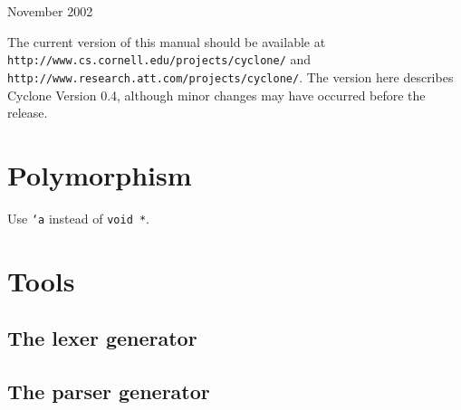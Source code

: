 \bigskip

\begin{center}
{\Large November 2002}
\end{center}

\bigskip

The current version of this manual should be available at\\
\texttt{http://www.cs.cornell.edu/projects/cyclone/} and\\
\texttt{http://www.research.att.com/projects/cyclone/}.  The version
here describes Cyclone Version 0.4, although minor changes may have
occurred before the release.

\newpage

\tableofcontents
\newpage





\section{Polymorphism}
\hypertarget{polymorphism}{}

Use \texttt{`a} instead of \texttt{void *}.








\appendix





\section{Tools}

\subsection{The lexer generator}
\subsection{The parser generator}



\printindex



